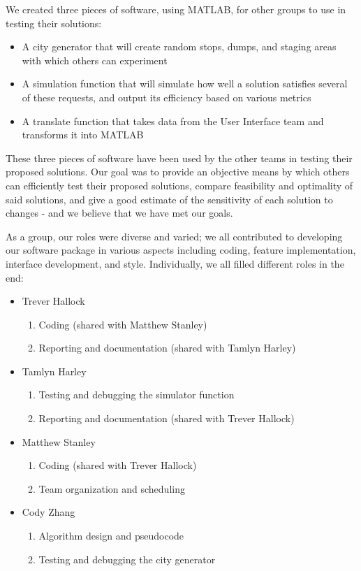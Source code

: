 \documentclass{article}
\begin{document}
We created three pieces of software, using MATLAB, for other groups to use in testing their solutions:

\begin{itemize}
\item A city generator that will create random stops, dumps, and staging areas with which others can experiment
\item A simulation function that will simulate how well a solution satisfies several of these requests, and output its efficiency based on various metrics
\item A translate function that takes data from the User Interface team and transforms it into MATLAB
\end{itemize}

These three pieces of software have been used by the other teams in testing their proposed solutions.  Our goal was to provide an objective means by which others can efficiently test their proposed solutions, compare feasibility and optimality of said solutions, and give a good estimate of the sensitivity of each solution to changes - and we believe that we have met our goals.


As a group, our roles were diverse and varied; we all contributed to developing our software package in various aspects including coding, feature implementation, interface development, and style.  Individually, we all filled different roles in the end:

\begin{itemize}
	\item Trever Hallock
	\begin{enumerate}
		\item Coding (shared with Matthew Stanley)
		\item Reporting and documentation (shared with Tamlyn Harley)
	\end{enumerate}
	\item Tamlyn Harley
	\begin{enumerate}
		\item Testing and debugging the simulator function
		\item Reporting and documentation (shared with Trever Hallock)
	\end{enumerate}
	\item Matthew Stanley
	\begin{enumerate}
		\item Coding (shared with Trever Hallock)
		\item Team organization and scheduling
	\end{enumerate}
	\item Cody Zhang
	\begin{enumerate}
		\item Algorithm design and pseudocode
		\item Testing and debugging the city generator
	\end{enumerate}
\end{itemize}
\end{document}
